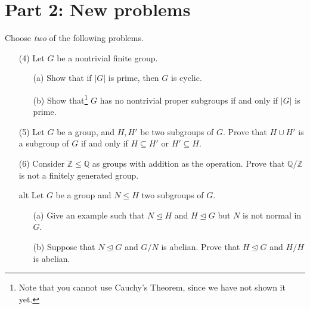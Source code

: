 \documentclass[11pt]{article}
\newcommand{\Q}{\mathbb{Q}}
\newcommand{\Z}{\mathbb{Z}}
\theoremstyle{definition}
\begin{document}
\section*{Part 2: New problems}

Choose \emph{two} of the following problems.

\begin{enumerate}
 
 \item[(4)] Let $G$ be a nontrivial finite group. 
 \begin{enumerate}
 \item[(a)] Show that if $|G|$ is prime, then $G$ is cyclic.
 \item[(b)] Show that\footnote{Note that you cannot use Cauchy's Theorem, since we have not shown it yet.} $G$ has no nontrivial proper subgroups if and only if $|G|$ is prime. 
  \end{enumerate}


\item[(5)] Let $G$ be a group, and $H, H'$ be two subgroups of $G$. Prove that $H\cup H'$ is a subgroup of $G$ if and only if $H\subseteq H'$ or $H' \subseteq H$.


\item[(6)] Consider $\Z \leq \Q$ as groups with addition as the operation. Prove that $\Q/\Z$ is not a finitely generated group.

\item[alt] Let $G$ be a group and $N\leq H$ two subgroups of $G$.
\begin{enumerate}
\item[(a)] Give an example such that $N\trianglelefteq H$ and $H\trianglelefteq G$ but $N$ is not normal in $G$.

\item[(b)] Suppose that $N\trianglelefteq G$ and $G/N$ is abelian. Prove that $H \trianglelefteq G$ and $H/H$ is abelian. 
\end{enumerate}

\end{enumerate}
\end{document}
